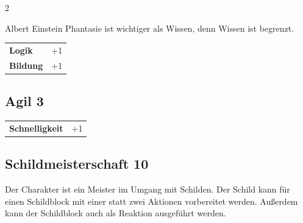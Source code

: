 \begin{multicols}{2}
\begin{tcolorbox}
\begin{pquote}{Albert Einstein}
Phantasie ist wichtiger als Wissen, denn Wissen ist begrenzt.
\end{pquote}

\vspace{3mm}

\begin{tabular}{@{}ll@{}}
    \textbf{Logik} & +1\\
    \textbf{Bildung} & +1\\
\end{tabular}


\end{tcolorbox}

\begin{tcolorbox}
    \subsection*{Agil \hfill \small{3 }}
    \tcblower




\begin{tabular}{@{}ll@{}}
    \textbf{Schnelligkeit} & +1\\
\end{tabular}


\end{tcolorbox}

\begin{tcolorbox}
    \subsection*{Schildmeisterschaft \hfill \small{10 }}
    \tcblower
Der Charakter ist ein Meister im Umgang mit Schilden. Der Schild kann für einen Schildblock mit einer statt zwei Aktionen vorbereitet werden. Außerdem kann der Schildblock auch als Reaktion ausgeführt werden.


\vspace{3mm}




\end{tcolorbox}
\end{multicols}
